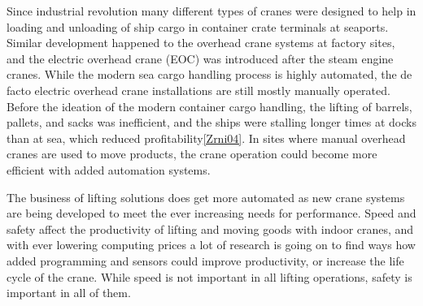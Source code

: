 \documentclass[12pt,a4paper,oneside,pdftex]{report}
\begin{document}
Since industrial revolution many different types of cranes were designed to help in loading and unloading of ship cargo in container crate terminals at seaports. Similar development happened to the overhead crane systems at factory sites, and the electric overhead crane (EOC) was introduced after the steam engine cranes. While the modern sea cargo handling process is highly automated, the de facto electric overhead crane installations are still mostly manually operated. Before the ideation of the modern container cargo handling, the lifting of barrels, pallets, and sacks was inefficient, and the ships were stalling longer times at docks than at sea, which reduced profitability\ref{Zrni04}. In sites where manual overhead cranes are used to move products, the crane operation could become more efficient with added automation systems.

The business of lifting solutions does get more automated as new crane systems are being developed to meet the ever increasing needs for performance. Speed and safety affect the productivity of lifting and moving goods with indoor cranes, and with ever lowering computing prices a lot of research is going on to find ways how added programming and sensors could improve productivity, or increase the life cycle of the crane. While speed is not important in all lifting operations, safety is important in all of them. 


\end{document}
